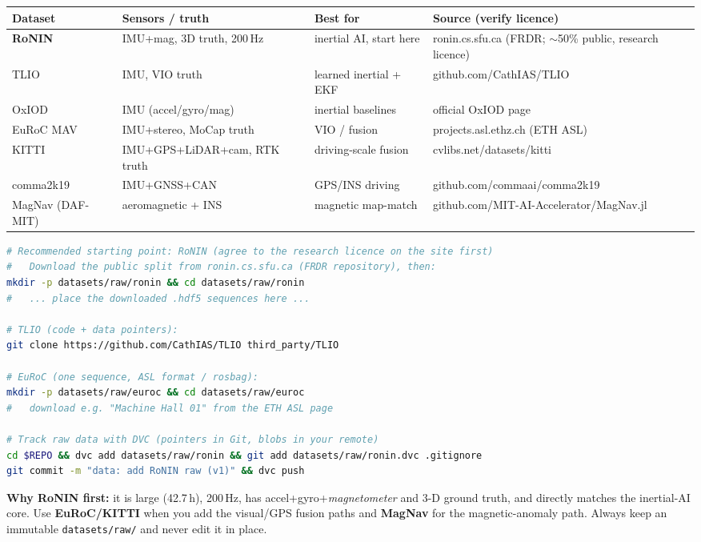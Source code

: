 \documentclass[11pt]{article}
\begin{document}
\begin{center}\footnotesize
\begin{tabular}{@{}p{2.2cm}p{3.4cm}p{2.0cm}p{4.0cm}@{}}
\toprule
\textbf{Dataset} & \textbf{Sensors / truth} & \textbf{Best for} & \textbf{Source (verify licence)}\\
\midrule
\textbf{RoNIN} & IMU+mag, 3D truth, 200\,Hz & inertial AI, start here & ronin.cs.sfu.ca (FRDR; $\sim$50\% public, research licence)\\
TLIO & IMU, VIO truth & learned inertial + EKF & github.com/CathIAS/TLIO\\
OxIOD & IMU (accel/gyro/mag) & inertial baselines & official OxIOD page\\
EuRoC MAV & IMU+stereo, MoCap truth & VIO / fusion & projects.asl.ethz.ch (ETH ASL)\\
KITTI & IMU+GPS+LiDAR+cam, RTK truth & driving-scale fusion & cvlibs.net/datasets/kitti\\
comma2k19 & IMU+GNSS+CAN & GPS/INS driving & github.com/commaai/comma2k19\\
MagNav (DAF-MIT) & aeromagnetic + INS & magnetic map-match & github.com/MIT-AI-Accelerator/MagNav.jl\\
\bottomrule
\end{tabular}
\end{center}

\begin{actbox}
\begin{lstlisting}[language=bash]
# Recommended starting point: RoNIN (agree to the research licence on the site first)
#   Download the public split from ronin.cs.sfu.ca (FRDR repository), then:
mkdir -p datasets/raw/ronin && cd datasets/raw/ronin
#   ... place the downloaded .hdf5 sequences here ...

# TLIO (code + data pointers):
git clone https://github.com/CathIAS/TLIO third_party/TLIO

# EuRoC (one sequence, ASL format / rosbag):
mkdir -p datasets/raw/euroc && cd datasets/raw/euroc
#   download e.g. "Machine Hall 01" from the ETH ASL page

# Track raw data with DVC (pointers in Git, blobs in your remote)
cd $REPO && dvc add datasets/raw/ronin && git add datasets/raw/ronin.dvc .gitignore
git commit -m "data: add RoNIN raw (v1)" && dvc push
\end{lstlisting}
\end{actbox}

\begin{defbox}
\textbf{Why RoNIN first:} it is large (42.7\,h), 200\,Hz, has accel+gyro+\emph{magnetometer}
and 3-D ground truth, and directly matches the inertial-AI core. Use \textbf{EuRoC/KITTI} when
you add the visual/GPS fusion paths and \textbf{MagNav} for the magnetic-anomaly path. Always
keep an immutable \texttt{datasets/raw/} and never edit it in place.
\end{defbox}
\end{document}
